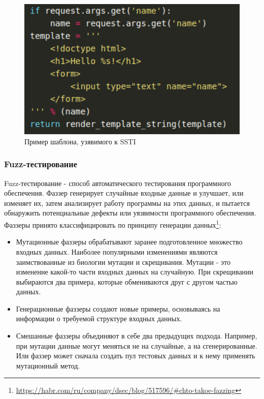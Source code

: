 \documentclass[a4paper]{article}
\begin{document}
\begin{figure}[ht!]
    \includegraphics[width=140mm]{SSTIJinja.png}
    \caption{Пример шаблона, узявимого к SSTI}
    \label{SSTIJinja}
    \end{figure}

\subsubsection{Fuzz-тестирование}
\indent

Fuzz-тестирование - способ автоматического тестирования программного обеспечения. Фаззер генерирует случайные входные данные и улучшает, или изменяет их, затем анализирует работу программы на этих данных, и пытается обнаружить потенциальные дефекты или уязвимости программного обеспечения. Фаззеры принято классифицировать по принципу генерации данных\footnote{\href{https://habr.com/ru/company/dsec/blog/517596/\#chto-takoe-fazzing}{https://habr.com/ru/company/dsec/blog/517596/\#chto-takoe-fazzing}}:


\begin{itemize}
\item Мутационные фаззеры обрабатывают заранее подготовленное множество входных данных. Наиболее популярными изменениями являются заимствованные из биологии мутации и скрещивания. Мутации - это изменение какой-то части входных данных на случайную. При скрещивании выбираются два примера, которые обмениваются друг с другом частью данных.
\item Генерационные фаззеры создают новые примеры, основываясь на информации о требуемой структуре входных данных. 
\item Смешанные фаззеры объединяют в себе два предыдущих подхода. Например, при мутации данные могут меняться не на случайные, а на сгенерированные. Или фаззер может сначала создать пул тестовых данных и к нему применять мутационный метод. 
\end{itemize}
\end{document}
